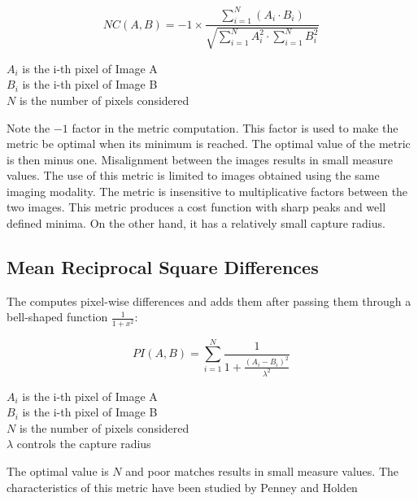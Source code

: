 \begin{equation}
NC(A,B) = -1 \times \frac{ \sum_{i=1}^N \left( A_i \cdot B_i \right) }
        { \sqrt { \sum_{i=1}^N A_i^2  \cdot \sum_{i=1}^N B_i^2 } }
\end{equation}
\begin{center}
$A_i$ is the i-th pixel of Image A\\ 
$B_i$ is the i-th pixel of Image B\\
$N$ is the number of pixels considered
\end{center}

Note the $-1$ factor in the metric computation. This factor is used to make the
metric be optimal when its minimum is reached.  The optimal value of the metric
is then minus one. Misalignment between the images results in small measure
values.  The use of this metric is limited to images obtained using the same
imaging modality.  The metric is insensitive to multiplicative factors between
the two images.  This metric produces a cost function with sharp peaks and well
defined minima.  On the other hand, it has a relatively small capture radius.

\subsection{Mean Reciprocal Square Differences}
\label{sec:MeanReciprocalSquareDifferenceMetric}

The  computes
pixel-wise differences and adds them after passing them through a bell-shaped
function $\frac{1}{1+x^2}$:

\begin{equation}
PI(A,B) =  \sum_{i=1}^N \frac{ 1 }{ 1 + \frac{ \left( A_i - B_i \right) ^ 2}{ \lambda^2 }  }
\end{equation}
\begin{center}
$A_i$ is the i-th pixel of Image A \\
$B_i$ is the i-th pixel of Image B \\
$N$ is the number of pixels considered \\
$\lambda$ controls the capture radius
\end{center}

The optimal value is $N$ and poor matches results in small measure values.
The characteristics of this metric have been studied by Penney and Holden
\cite{Holden1999}\cite{Penney1998}

